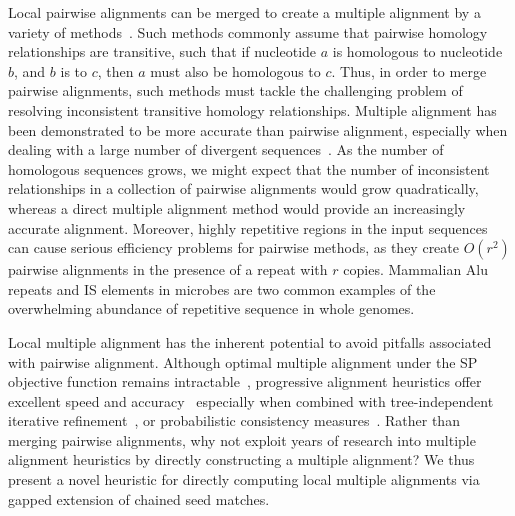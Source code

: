 \documentclass[9.5pt,journal,final,finalsubmission,twocolumn]{IEEEtran}
\begin{document}
Local pairwise alignments can be merged to create a multiple alignment
by a variety of
methods~\cite{ref-tba,ref-dialign,ref-related1}. Such methods
commonly assume that pairwise homology relationships are transitive,
such that if nucleotide $a$ is homologous to nucleotide $b$, and $b$
is to $c$, then $a$ must also be homologous to $c$.  Thus, in order to
merge pairwise alignments, such methods must tackle the challenging
problem of resolving inconsistent transitive homology relationships.
Multiple alignment has been demonstrated to be more accurate than
pairwise alignment, especially when dealing with a large number of
divergent sequences~\cite{ref-mlagan,ref-aubergene}.  As the number of
homologous sequences grows, we might expect that the number of
inconsistent relationships in a collection of pairwise alignments
would grow quadratically, whereas a direct multiple alignment method
would provide an increasingly accurate alignment.  Moreover, highly
repetitive regions in the input sequences can cause serious efficiency
problems for pairwise methods, as they create $O(r^{2})$ pairwise
alignments in the presence of a repeat with $r$ copies.  Mammalian Alu
repeats and IS elements in microbes are two common examples of the
overwhelming abundance of repetitive sequence in whole genomes.

Local multiple alignment has the inherent potential to avoid pitfalls
associated with pairwise alignment. Although optimal multiple
alignment under the SP objective function remains
intractable~\cite{ref-wangjiang}, progressive alignment heuristics
offer excellent speed and accuracy~\cite{ref-clustalw,ref-tcoffee}
especially when combined with tree-independent iterative
refinement~\cite{ref-muscle}, or probabilistic consistency
measures~\cite{ref-probcons}. Rather than merging pairwise alignments,
why not exploit years of research into multiple alignment heuristics
by directly constructing a multiple alignment? We thus present a novel
heuristic for directly computing local multiple alignments via gapped
extension of chained seed matches.
\end{document}
